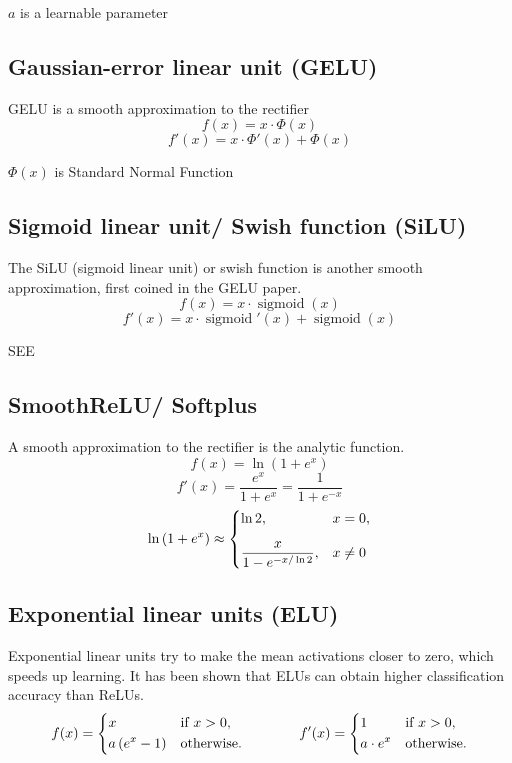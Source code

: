$a$ is a learnable parameter

\subsection{Gaussian-error linear unit (GELU)}\label{Gaussian-error linear unit (GELU)}
GELU is a smooth approximation to the rectifier
\[
    f(x)=x\cdot \Phi (x)
\]
\[
    f'(x)=x\cdot \Phi '(x)+\Phi (x)
\]

$\Phi (x)$ is Standard Normal Function


\subsection{Sigmoid linear unit/ Swish function (SiLU)}\label{Sigmoid linear unit/ Swish function (SiLU)}
The SiLU (sigmoid linear unit) or swish function is another smooth approximation, first coined in the GELU paper.
\[
    f(x)=x\cdot \operatorname {sigmoid} (x)
\]
\[
    f'(x)=x\cdot \operatorname {sigmoid} '(x)+\operatorname {sigmoid} (x)
\]

SEE 

\subsection{SmoothReLU/ Softplus \cite{wiki-Rectifier}}\label{SmoothReLU/ Softplus}
A smooth approximation to the rectifier is the analytic function.
\[ 
f(x)=\ln(1+e^{x}) 
\]
\[
f'(x)={\dfrac {e^{x}}{1+e^{x}}}={\displaystyle \dfrac {1}{1+e^{-x}}} 
\]
\[ 
    \ln \left(1+e^{x}\right)\approx {\begin{dcases}\ln 2,&x=0,\\[6pt]{\displaystyle \dfrac {x}{1-e^{-x/\ln 2}}},&x\neq 0\end{dcases}} 
\]

\subsection{Exponential linear units (ELU) \cite{wiki-Rectifier}}\label{Exponential linear units (ELU)}
Exponential linear units try to make the mean activations closer to zero, which speeds up learning. It has been shown that ELUs can obtain higher classification accuracy than ReLUs.
\[
    {\displaystyle f(x)={\begin{dcases}x&{\text{if }}x>0,\\a\left(e^{x}-1\right)&{\text{otherwise}}.\end{dcases}}\qquad \qquad f'(x)={\begin{dcases}1&{\text{if }}x>0,\\a\cdot e^{x}&{\text{otherwise}}.\end{dcases}}}
\]

